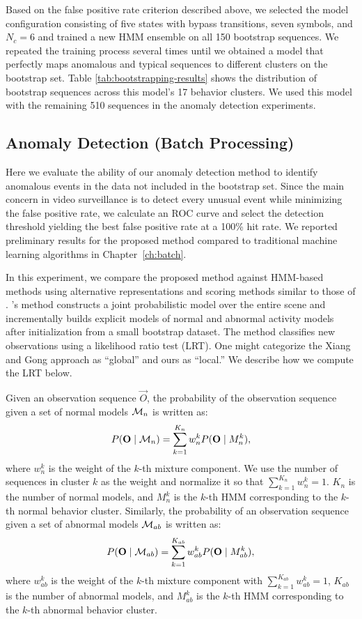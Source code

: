Based on the false positive rate criterion described above, we
selected the model configuration consisting of five states with 
bypass transitions, seven symbols, and $N_c = 6$ and trained a 
new HMM ensemble on all 150
bootstrap sequences.  We repeated the training process several times
until we obtained a model that perfectly maps anomalous and typical 
sequences to different clusters on the bootstrap set.  
Table \ref{tab:bootstrapping-results} shows the
distribution of bootstrap sequences across this model's 17 behavior
clusters. We used this model with the remaining 510 sequences in the
anomaly detection experiments.

\subsection{Anomaly Detection (Batch Processing)}
\label{incremental-against-global-method}

Here we evaluate the ability of our anomaly detection method to
identify anomalous events in the data not included in the bootstrap
set. Since the main concern in video surveillance is to detect every
unusual event while minimizing the false positive rate, we calculate
an ROC curve and select the detection threshold yielding the best
false positive rate at a 100\% hit rate. We reported preliminary
results for the proposed method compared to traditional machine
learning algorithms in Chapter~\ref{ch:batch}.


In this experiment, we compare the proposed method against HMM-based
methods using alternative representations and scoring methods similar
to those of . 's 
method constructs a joint probabilistic 
model over the entire scene and incrementally builds explicit models of 
normal and abnormal activity models after initialization from a small 
bootstrap dataset. The method classifies new observations using a likelihood 
ratio test (LRT). One might categorize the Xiang and Gong approach as ``global'' 
and ours as ``local.'' We describe how we compute the LRT below.

Given an observation sequence $\vec{O}$, the probability of the observation 
sequence given a set of normal models ${\cal M}_n$ is written as:
\[
    P(\vec{O} \mid {\cal M}_n) = \sum_{k=1}^{K_n}w_n^kP(\vec{O} \mid M_n^k), 
\]
where $w_n^k$ is the weight of the $k$-th mixture component. We use the 
number of sequences in cluster $k$ as the weight and normalize it so that 
$\sum_{k=1}^{K_n}w_n^k = 1$. $K_n$ is the number of normal models, 
and $M_n^k$ is the $k$-th HMM corresponding to the $k$-th normal 
behavior cluster. Similarly, the probability of an observation 
sequence given a set of abnormal models ${\cal M}_{ab}$ 
is written as: 
\[
    P(\vec{O} \mid {\cal M}_{ab}) = \sum_{k=1}^{K_{ab}}w_{ab}^kP(\vec{O} \mid M_{ab}^k), 
\]
where $w_{ab}^k$ is the weight of the $k$-th mixture component 
with $\sum_{k=1}^{K_{ab}}w_{ab}^k = 1$, $K_{ab}$ is the number of 
abnormal models, 
and $M_{ab}^k$ is the $k$-th HMM corresponding to the $k$-th abnormal 
behavior cluster. 

